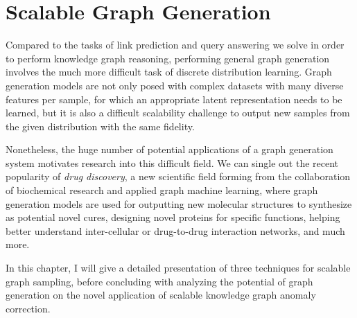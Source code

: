 \chapter{Scalable Graph Generation}
\label{chp: generation}

Compared to the tasks of link prediction and query answering we solve in order to perform knowledge graph reasoning, performing general graph generation involves the much more difficult task of discrete distribution learning. Graph generation models are not only posed with complex datasets with many diverse features per sample, for which an appropriate latent representation needs to be learned, but it is also a difficult scalability challenge to output new samples from the given distribution with the same fidelity. 

Nonetheless, the huge number of potential applications of a graph generation system motivates research into this difficult field. We can single out the recent popularity of \emph{drug discovery}, a new scientific field forming from the collaboration of biochemical research and applied graph machine learning, where graph generation models are used for outputting new molecular structures to synthesize as potential novel cures, designing novel proteins for specific functions, helping better understand inter-cellular or drug-to-drug interaction networks, and much more.

In this chapter, I will give a detailed presentation of three techniques for scalable graph sampling, before concluding with analyzing the potential of graph generation on the novel application of scalable knowledge graph anomaly correction.







